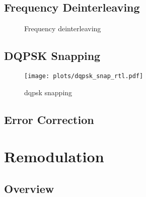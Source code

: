 \documentclass[class=report,11pt,crop=false]{standalone}
\begin{document}
\subsection{Frequency Deinterleaving \label{subsect:dab-proc_freq-deinterleave}}

\begin{figure}[htbp]
  \centering
  \captionsetup{type=figure}
  \def\svgwidth{\linewidth}
  { %
      }
  \caption{Frequency deinterleaving}
  \label{fig:freq_deinterleave}
\end{figure}

\subsection{DQPSK Snapping \label{subsect:dab-proc_dqpsk-snap}}

\begin{figure}[htbp]
  \centering
  \captionsetup{type=figure}
  \texttt{[image: plots/dqpsk\_snap\_rtl.pdf]}
  \caption{}
  \label{fig:dqpsk_snap_rtl}
\end{figure}

\begin{figure}[htbp]
  \centering
  \captionsetup{type=figure}
  \def\svgwidth{\linewidth}
  { %
      }
  \caption{}
  \label{fig:dqpsk_snap_rtl-alt}
\end{figure}

\begin{figure}[htbp]
  \centering
  \captionsetup{type=figure}
  \def\svgwidth{\linewidth}
  { %
      }
  \caption{\gls{dqpsk} snapping}
  \label{fig:dqpsk_snap}
\end{figure}

\subsection{Error Correction \label{subsect:dab-proc_error-correct}}

\section{Remodulation \label{sect:dab-proc_remodulate}}

\subsection{Overview}
\end{document}
